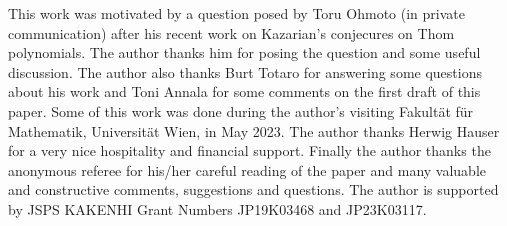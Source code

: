 \documentclass[a4paper]{amsart}
\begin{document}
This work was motivated by a question posed by Toru Ohmoto  (in private communication) after his recent work \cite{Ohmoto} on Kazarian's conjecures \cite{Kaz} on Thom polynomials. The author thanks him for posing the question and some useful discussion. The author also thanks Burt Totaro for answering some questions about his work \cite{Totaro} and Toni Annala for some comments on the first draft of this paper.
Some of this work was done during the author's visiting Fakult\"at f\"ur Mathematik, Universit\"at Wien, in May 2023. The author thanks Herwig Hauser for a very nice hospitality and financial support. Finally the author thanks the anonymous referee for his/her careful reading of the paper and many valuable and constructive comments, suggestions and questions.
The author is supported by JSPS KAKENHI Grant Numbers JP19K03468 and JP23K03117.
\end{document}
